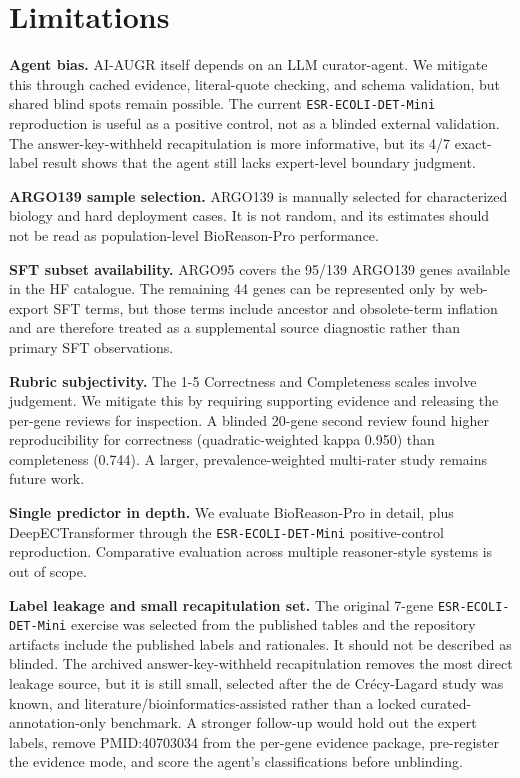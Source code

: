 \documentclass[
  11pt,
]{article}
\begin{document}
\hypertarget{limitations}{%
\section{Limitations}\label{limitations}}

\textbf{Agent bias.} AI-AUGR itself depends on an LLM curator-agent. We
mitigate this through cached evidence, literal-quote checking, and
schema validation, but shared blind spots remain possible. The current
\texttt{ESR-ECOLI-DET-Mini} reproduction is useful as a positive
control, not as a blinded external validation. The answer-key-withheld
recapitulation is more informative, but its 4/7 exact-label result shows
that the agent still lacks expert-level boundary judgment.

\textbf{ARGO139 sample selection.} ARGO139 is manually selected for
characterized biology and hard deployment cases. It is not random, and
its estimates should not be read as population-level BioReason-Pro
performance.

\textbf{SFT subset availability.} ARGO95 covers the 95/139 ARGO139 genes
available in the HF catalogue. The remaining 44 genes can be represented
only by web-export SFT terms, but those terms include ancestor and
obsolete-term inflation and are therefore treated as a supplemental
source diagnostic rather than primary SFT observations.

\textbf{Rubric subjectivity.} The 1-5 Correctness and Completeness
scales involve judgement. We mitigate this by requiring supporting
evidence and releasing the per-gene reviews for inspection. A blinded
20-gene second review found higher reproducibility for correctness
(quadratic-weighted kappa 0.950) than completeness (0.744). A larger,
prevalence-weighted multi-rater study remains future work.

\textbf{Single predictor in depth.} We evaluate BioReason-Pro in detail,
plus DeepECTransformer through the \texttt{ESR-ECOLI-DET-Mini}
positive-control reproduction. Comparative evaluation across multiple
reasoner-style systems is out of scope.

\textbf{Label leakage and small recapitulation set.} The original 7-gene
\texttt{ESR-ECOLI-DET-Mini} exercise was selected from the published
tables and the repository artifacts include the published labels and
rationales. It should not be described as blinded. The archived
answer-key-withheld recapitulation removes the most direct leakage
source, but it is still small, selected after the de Crécy-Lagard study
was known, and literature/bioinformatics-assisted rather than a locked
curated-annotation-only benchmark. A stronger follow-up would hold out
the expert labels, remove PMID:40703034 from the per-gene evidence
package, pre-register the evidence mode, and score the agent's
classifications before unblinding.
\end{document}
